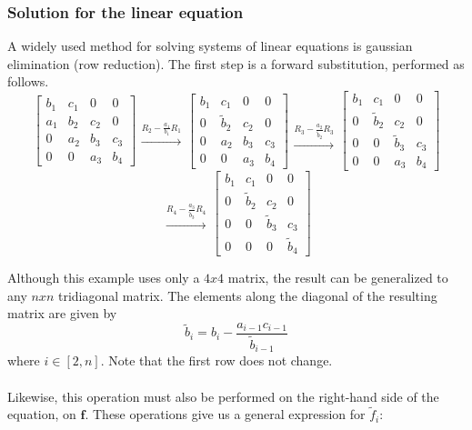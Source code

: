 \documentclass[12pt]{article}
\begin{document}
\subsubsection{Solution for the linear equation}
A widely used method for solving systems of linear equations is gaussian elimination
(row reduction). The first step is a forward substitution, performed as follows.
\[
\begin{bmatrix}
b_1 & c_1 & 0 & 0 \\ a_1 & b_2 & c_2 & 0 \\ 0 & a_2 & b_3 & c_3 \\ 0 & 0 & a_3 & b_4
\end{bmatrix}
\begin{matrix}
~ \\ \xrightarrow{R_2-\frac{a_1}{b_1}R_1}
\end{matrix}
\begin{bmatrix}
b_1 & c_1 & 0 & 0 \\ 0 & \tilde{b}_2 & c_2 & 0 \\ 0 & a_2 & b_3 & c_3 \\ 0 & 0 & a_3 & b_4
\end{bmatrix}
\begin{matrix}
~ \\ ~ \\ \xrightarrow{R_3-\frac{a_2}{\tilde{b}_2}R_3} 
\end{matrix}
\begin{bmatrix}
b_1 & c_1 & 0 & 0 \\ 0 & \tilde{b}_2 & c_2 & 0 \\ 0 & 0 & \tilde{b}_3 & c_3 \\ 0 & 0 & a_3 & b_4
\end{bmatrix}
\]\[ %
\begin{matrix}
~ \\ \xrightarrow{R_4-\frac{a_3}{\tilde{b}_3}R_4} 
\end{matrix}
\begin{bmatrix}
b_1 & c_1 & 0 & 0 \\ 0 & \tilde{b}_2 & c_2 & 0 \\ 0 & 0 & \tilde{b}_3 & c_3 \\ 0 & 0 & 0 & \tilde{b}_4
\end{bmatrix}
\]

\noindent Although this example uses only a $4x4$ matrix, the result can be generalized to any $nxn$ tridiagonal matrix.
The elements along the diagonal of the resulting matrix are given by
\begin{equation}\label{eq:diag-el}
\tilde{b}_i = b_i - \frac{a_{i-1}c_{i-1}}{\tilde{b}_{i-1}}
\end{equation}
where $i \in [2,n]$. Note that the first row does not change.\\ \\
Likewise, this operation must also be performed on the right-hand side of the equation, on
$\mathbf{f}$. These operations give us a general expression for $\tilde{f}_i$:
\end{document}
